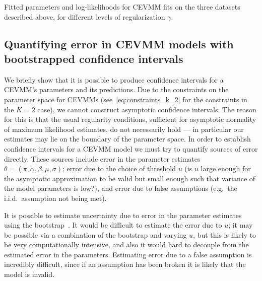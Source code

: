 \documentclass[11pt,twoside,openany]{book}
\numberwithin{Theorem}{chapter}
\numberwithin{Definition}{chapter}
\numberwithin{Lemma}{chapter}
\numberwithin{Algorithm}{chapter}
\numberwithin{equation}{chapter}
\begin{document}
\begin{table}[htp]
  \centering
    
\caption{Fitted parameters and log-likelihoods for CEVMM fits on the three
datasets described above, for different levels of regularization $\gamma$.\label{table:regularization_3}}
\end{table}


\subsection{Quantifying error in CEVMM models with bootstrapped confidence
intervals}\label{sec:cevvm_uncertainty}

We briefly show that it is possible to produce confidence intervals
for a CEVMM's parameters and its predictions.
Due to the constraints on the parameter space for CEVMMs
(see~\eqref{eq:constraints_k_2} for the constraints in the $K=2$ case),
we cannot construct asymptotic confidence intervals.
The reason for this is that the usual regularity conditions, sufficient for
asymptotic normality of maximum likelihood estimates, do not necessarily hold
--- in particular our estimates may lie on the boundary of the parameter space.
In order to establish confidence intervals for a CEVMM model we must
try to quantify sources of error directly. These sources include
error in the parameter estimates $\theta=(\pi,\alpha,\beta,\mu,\sigma)$;
error due to the choice of threshold $u$ (is $u$ large enough
    for the asymptotic approximation to be valid but small enough such that
    variance of the model parameters is low?), and error due to false assumptions (e.g.\ the i.i.d.\ assumption not being met).

It is possible to estimate uncertainty due to error in the parameter
estimates using the bootstrap~\citep{efron1994introduction}.
It would be difficult to estimate the error due to $u$; it may be possible via
a combination of the bootstrap and varying $u$, but this is likely to be very
computationally intensive, and also it would hard to decouple from
the estimated error in the parameters.
Estimating error due to a false assumption is incredibly difficult,
since if an assumption has been broken it is likely that the model is invalid.

\end{document}
